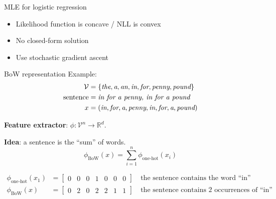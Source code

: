 \documentclass[usenames,dvipsnames,notes,11pt,aspectratio=169]{beamer}
\newcommand{\pdfnote}[1]{}
\newcommand\w[1]{\textit{#1}}
\begin{document}
\begin{frame}
    {MLE for logistic regression}
    \begin{itemize}
        \item Likelihood function is concave / NLL is convex
        \item No closed-form solution 
        \item Use stochastic gradient ascent 
    \end{itemize}
    \pdfnote{LR is probabilisti, so we can still do MLE.}
\end{frame}

\begin{frame}
    {BoW representation}
    Example:
    \begin{align*}
        \mathcal{V} &= \pc{\w{the}, \w{a}, \w{an}, \w{in}, \w{for}, \w{penny}, \w{pound}}\\
        \text{sentence} &= \w{in for a penny, in for a pound} \\
        x &= \p{\w{in}, \w{for}, \w{a}, \w{penny}, \w{in}, \w{for}, \w{a}, \w{pound}}
    \end{align*}

    \textbf{Feature extractor}: $\phi\colon \mathcal{V}^n \rightarrow \mathbb{R}^d$.
    \pause

    \textbf{Idea}: a sentence is the ``sum'' of words.
    $$
    \phi_{\text{BoW}}(x) = \sum_{i=1}^n \phi_{\text{one-hot}}(x_i)
    $$
    \vspace{-1em}

    \begin{align*}
        \phi_{\text{one-hot}}(x_1) &= \begin{bmatrix} 0 & 0 & 0 & 1 & 0 & 0 & 0 \end{bmatrix}
        \quad \text{the sentence contains the word ``in''}\\
        \phi_{\text{BoW}}(x)  &= \begin{bmatrix} 0 & 2 & 0 & 2 & 2 & 1 & 1 \end{bmatrix}
        \quad \text{the sentence contains 2 occurrences of ``in''}\\
    \end{align*}
\end{frame}
\end{document}
